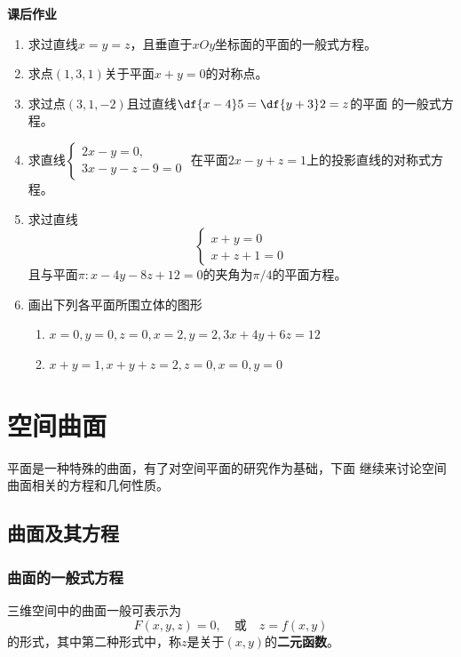 \begin{ext}
	{\bf 课后作业}
	\begin{enumerate}
	  \item 求过直线$x=y=z$，且垂直于$xOy$坐标面的平面的一般式方程。
	  \item 求点$(1,3,1)$关于平面$x+y=0$的对称点。
	  \item 求过点$(3,1,-2)$且过直线$\df{x-4}5=\df{y+3}2=z$的平面
	  的一般式方程。
	  \item 求直线$\left\{\begin{array}{l}
	  	2x-y=0, \\ 3x-y-z-9=0
	  \end{array}\right.$
	  在平面$2x-y+z=1$上的投影直线的对称式方程。
	  \item 求过直线
		$$\left\{\begin{array}{l}
			x+y=0\\
			x+z+1=0
		\end{array}\right.$$
		且与平面$\pi:x-4y-8z+12=0$的夹角为$\pi/4$的平面方程。
	  \item 画出下列各平面所围立体的图形
	  \begin{enumerate}[(1)]
	    \item $x=0,y=0,z=0,x=2,y=2,3x+4y+6z=12$
	    \item $x+y=1,x+y+z=2,z=0,x=0,y=0$
	  \end{enumerate}
	\end{enumerate}
\end{ext}

\section{空间曲面}

平面是一种特殊的曲面，有了对空间平面的研究作为基础，下面
继续来讨论空间曲面相关的方程和几何性质。

\subsection{曲面及其方程}

\subsubsection{曲面的一般式方程}

三维空间中的曲面一般可表示为
$$F(x,y,z)=0,\quad\mbox{或}\quad z=f(x,y)$$
的形式，其中第二种形式中，称$z$是关于$(x,y)$的{\bf 二元函数}。

% 

